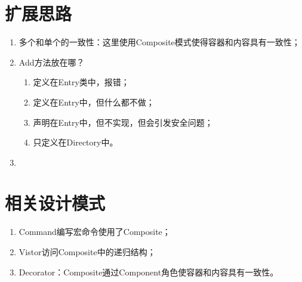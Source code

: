 \section{扩展思路}
\begin{enumerate}
	\item 多个和单个的一致性：这里使用Composite模式使得容器和内容具有一致性；
	\item Add方法放在哪？
	\begin{enumerate}
		\item 定义在Entry类中，报错；
		\item 定义在Entry中，但什么都不做；
		\item 声明在Entry中，但不实现，但会引发安全问题；
		\item 只定义在Directory中。
	\end{enumerate}
	\item 
\end{enumerate}
\section{相关设计模式}
\begin{enumerate}
	\item Command编写宏命令使用了Composite；
	\item Vistor访问Composite中的递归结构；
	\item Decorator：Composite通过Component角色使容器和内容具有一致性。
\end{enumerate}
